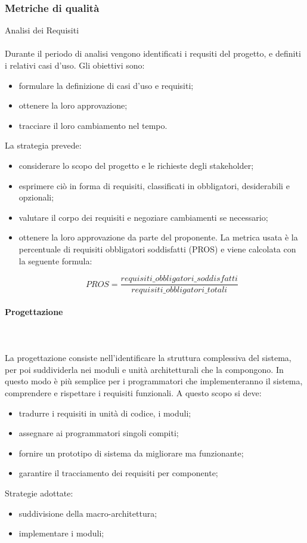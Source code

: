 	\subsubsection{Metriche di qualità}
			Analisi dei Requisiti \mbox{} \\ \mbox{} \\
			Durante il periodo di analisi vengono identificati i requsiti del progetto, e definiti i relativi casi d'uso. 
			Gli obiettivi sono:
			\begin{itemize}
			\item  formulare la definizione di casi d’uso e requisiti;
			\item ottenere la loro approvazione;
			\item tracciare il loro cambiamento nel tempo.
			\end{itemize}
			La strategia prevede:
			\begin{itemize}
			\item considerare lo scopo del progetto e le richieste degli stakeholder;
			\item esprimere ciò in forma di requisiti, classificati in obbligatori, desiderabili e opzionali;
			\item valutare il corpo dei requisiti e negoziare cambiamenti se necessario;
			\item ottenere la loro approvazione da parte del proponente.
			La metrica usata è la percentuale di requisiti obbligatori soddisfatti (PROS) e viene
calcolata con la seguente formula: 

		\[ PROS = \frac{requisiti\_obbligatori\_soddisfatti}{requisiti\_obbligatori\_totali} \]
	
			\end{itemize}
			\paragraph{Progettazione} \mbox{} \\ \mbox{} \\
			La progettazione consiste nell'identificare la struttura complessiva del sistema, per poi suddividerla nei moduli e unità architetturali che la compongono. In questo modo è più semplice per i programmatori che implementeranno il sistema, comprendere e rispettare i requisiti funzionali.
			A questo scopo si deve:
			\begin{itemize}
			\item tradurre i requisiti in unità di codice, i moduli;
			\item assegnare ai programmatori singoli compiti;
			\item fornire un prototipo di sistema da migliorare ma funzionante;
			\item garantire il tracciamento dei requisiti per componente;
			\end{itemize}
			Strategie adottate:
			\begin{itemize}			
			\item suddivisione della macro-architettura;
			\item implementare i moduli;
			\end{itemize}
